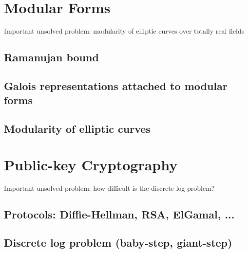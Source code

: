 \documentclass{book}
\begin{document}
\chapter{Modular Forms}
Important unsolved problem: modularity of elliptic curves
over totally real fields

\section{Ramanujan bound}
\section{Galois representations attached to modular forms}
\section{Modularity of elliptic curves}




\chapter{Public-key Cryptography}

Important unsolved problem: how difficult is the discrete log problem?

\section{Protocols: Diffie-Hellman, RSA, ElGamal, ...}
\section{Discrete log problem (baby-step, giant-step)}




\end{document}
